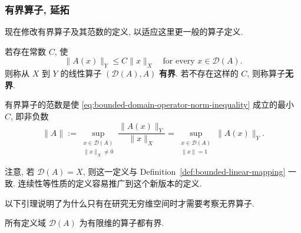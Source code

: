 \subsubsection{有界算子, 延拓}\label{subsec:bounded-operators-extensions}

现在修改有界算子及其范数的定义, 以适应这里更一般的算子定义.

\begin{Definition}
\label{def:bounded-operator-specified-domain}
若存在常数 $C$, 使
\begin{equation}\label{eq:bounded-domain-operator-norm-inequality}
\|A(x)\|_Y\leq C\|x\|_X\quad\text{for every }x\in\mathcal{D}(A).
\end{equation}
则称从 $X$ 到 $Y$ 的线性算子 $(\mathcal{D}(A),A)$ \textbf{有界}. 若不存在这样的 $C$, 则称算子\textbf{无界}.

有界算子的范数是使 \eqref{eq:bounded-domain-operator-norm-inequality} 成立的最小 $C$, 即非负数
\begin{equation}\label{eq:bounded-domain-operator-norm-definition}
\|A\|:=\sup_{\substack{x\in\mathcal{D}(A)\\\|x\|_X\ne0}}\dfrac{\|A(x)\|_Y}{\|x\|_X}=\sup_{\substack{x\in\mathcal{D}(A)\\\|x\|=1}}\|A(x)\|_Y.
\end{equation}

\end{Definition}

注意, 若 $\mathcal{D}(A)=X$, 则这一定义与 Definition~\ref{def:bounded-linear-mapping} 一致. 连续性等性质的定义容易推广到这个新版本的定义.

以下引理说明了为什么只有在研究无穷维空间时才需要考察无界算子.

\begin{Lemma}
\label{lem:finite-dimensional-domain-operators-bounded}
所有定义域 $\mathcal{D}(A)$ 为有限维的算子都有界.
\end{Lemma}

\begingroup
{}
\renewcommand{\endProof}{\par\nobreak\hfill$\blacksquare$\par\vspace{0.1cm}}
\endgroup

